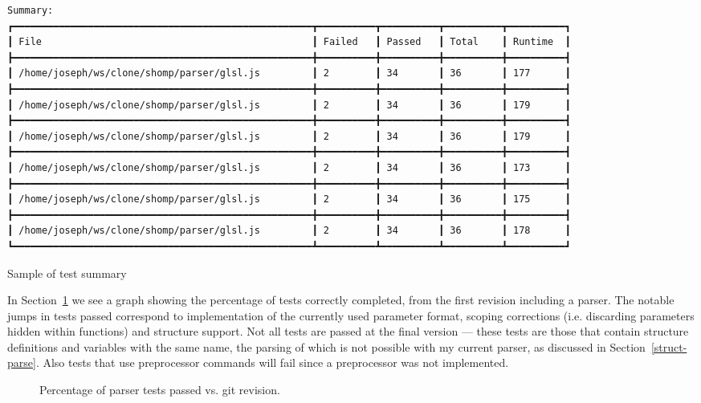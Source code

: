 \documentclass[12pt,twoside,notitlepage]{report}
\begin{document}
\begin{listing}[H]
{\tiny
\begin{verbatim}
Summary:
┏━━━━━━━━━━━━━━━━━━━━━━━━━━━━━━━━━━━━━━━━━━━━━━━━━━━━┳━━━━━━━━━━┳━━━━━━━━━━┳━━━━━━━━━━┳━━━━━━━━━━┓
┃ File                                               ┃ Failed   ┃ Passed   ┃ Total    ┃ Runtime  ┃
┣━━━━━━━━━━━━━━━━━━━━━━━━━━━━━━━━━━━━━━━━━━━━━━━━━━━━╋━━━━━━━━━━╋━━━━━━━━━━╋━━━━━━━━━━╋━━━━━━━━━━┫
┃ /home/joseph/ws/clone/shomp/parser/glsl.js         ┃ 2        ┃ 34       ┃ 36       ┃ 177      ┃
┣━━━━━━━━━━━━━━━━━━━━━━━━━━━━━━━━━━━━━━━━━━━━━━━━━━━━╋━━━━━━━━━━╋━━━━━━━━━━╋━━━━━━━━━━╋━━━━━━━━━━┫
┃ /home/joseph/ws/clone/shomp/parser/glsl.js         ┃ 2        ┃ 34       ┃ 36       ┃ 179      ┃
┣━━━━━━━━━━━━━━━━━━━━━━━━━━━━━━━━━━━━━━━━━━━━━━━━━━━━╋━━━━━━━━━━╋━━━━━━━━━━╋━━━━━━━━━━╋━━━━━━━━━━┫
┃ /home/joseph/ws/clone/shomp/parser/glsl.js         ┃ 2        ┃ 34       ┃ 36       ┃ 179      ┃
┣━━━━━━━━━━━━━━━━━━━━━━━━━━━━━━━━━━━━━━━━━━━━━━━━━━━━╋━━━━━━━━━━╋━━━━━━━━━━╋━━━━━━━━━━╋━━━━━━━━━━┫
┃ /home/joseph/ws/clone/shomp/parser/glsl.js         ┃ 2        ┃ 34       ┃ 36       ┃ 173      ┃
┣━━━━━━━━━━━━━━━━━━━━━━━━━━━━━━━━━━━━━━━━━━━━━━━━━━━━╋━━━━━━━━━━╋━━━━━━━━━━╋━━━━━━━━━━╋━━━━━━━━━━┫
┃ /home/joseph/ws/clone/shomp/parser/glsl.js         ┃ 2        ┃ 34       ┃ 36       ┃ 175      ┃
┣━━━━━━━━━━━━━━━━━━━━━━━━━━━━━━━━━━━━━━━━━━━━━━━━━━━━╋━━━━━━━━━━╋━━━━━━━━━━╋━━━━━━━━━━╋━━━━━━━━━━┫
┃ /home/joseph/ws/clone/shomp/parser/glsl.js         ┃ 2        ┃ 34       ┃ 36       ┃ 178      ┃
┗━━━━━━━━━━━━━━━━━━━━━━━━━━━━━━━━━━━━━━━━━━━━━━━━━━━━┻━━━━━━━━━━┻━━━━━━━━━━┻━━━━━━━━━━┻━━━━━━━━━━┛

\end{verbatim}
}
\caption{Sample of test summary\label{summary}}
\end{listing}
In Section~\ref{parser-git} we see a graph showing the percentage of tests correctly completed, from the first revision including a parser. The notable jumps in tests passed correspond to implementation of the currently used parameter format, scoping corrections (i.e. discarding parameters hidden within functions) and structure support. Not all tests are passed at the final version --- these tests are those that contain structure definitions and variables with the same name, the parsing of which is not possible with my current parser, as discussed in Section~\ref{struct-parse}. Also tests that use preprocessor commands will fail since a preprocessor was not implemented.

\begin{figure}
\caption{Percentage of parser tests passed vs. git revision.\label{parser-git}}
\end{figure}
\end{document}
